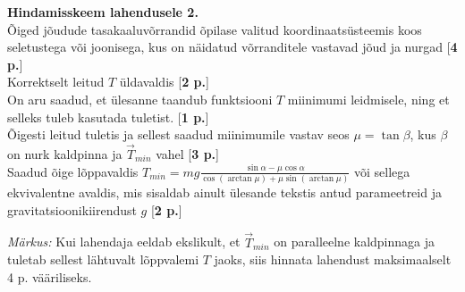 \documentclass[12pt,a5paper]{article}
\begin{document}
\textbf{Hindamisskeem lahendusele 2.} \\
Õiged jõudude tasakaaluvõrrandid õpilase valitud koordinaatsüsteemis koos seletustega või joonisega, kus on näidatud võrranditele vastavad jõud ja nurgad [\textbf{4 p.}]\\
Korrektselt leitud $T$ üldavaldis [\textbf{2 p.}]\\
On aru saadud, et ülesanne taandub funktsiooni $T$ miinimumi leidmisele, ning et selleks tuleb kasutada tuletist. [\textbf{1 p.}]\\
Õigesti leitud tuletis ja sellest saadud miinimumile vastav seos $\mu=\tan\beta$, kus $\beta$ on nurk kaldpinna ja $\overrightarrow{T}_{min}$ vahel [\textbf{3 p.}]\\
Saadud õige lõppavaldis $T_{min}=mg\frac{\sin\alpha-\mu\cos\alpha}{\cos(\arctan\mu)+\mu\sin(\arctan\mu)}$ või sellega ekvivalentne avaldis, mis sisaldab ainult ülesande tekstis antud parameetreid
ja gravitatsioonikiirendust $g$ [\textbf{2 p.}]

\emph{Märkus:} Kui lahendaja eeldab ekslikult, et $\overrightarrow{T}_{min}$ on paralleelne kaldpinnaga ja tuletab sellest lähtuvalt lõppvalemi $T$ jaoks, siis hinnata lahendust
maksimaalselt 4 p. vääriliseks.
\end{document}
